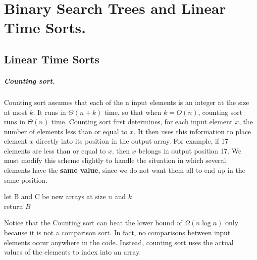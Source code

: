 


\ifdefined\BOOK
\else
\setcounter{chapter}{5}
\fi
\chapter{Binary Search Trees and Linear Time Sorts.} 

\section{Linear Time Sorts}
\paragraph{ Counting sort.} Counting sort assumes that each of the n input elements is an integer at the size at most $k$. It runs in $\Theta \left(n + k\right)$ time, so that when $k = O(n)$, counting sort runs in $\Theta\left(n\right)$ time.
Counting sort first determines, for each input element $x$, the number of elements less than or equal to $x$. It then uses this information to place element $x$ directly into its position in the output array. For example, if 17 elements are less than or equal to $x$, then $x$ belongs in output position 17. We must modify this scheme slightly to handle the situation in which several elements have the \textbf{same value}, since we do not want them all to end up in the same position.

  \begin{algorithm}
  	let B and C be new arrays at size $n$ and $k$ \\ 
	  return $B$
  \end{algorithm}

Notice that the Counting sort can beat the lower bound of $\Omega\left(n \log n\right)$ only because it is not a comparison sort. In fact, no comparisons between input elements occur anywhere in the code. Instead, counting sort uses the actual values of the elements to index into an array.


